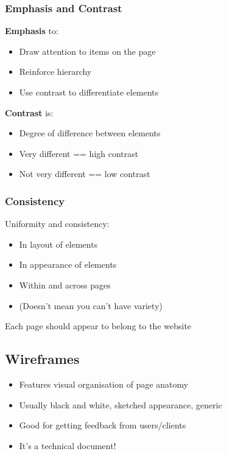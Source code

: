 \subsubsection{Emphasis and Contrast}
\textbf{Emphasis} to:
\begin{itemize}
	\item Draw attention to items on the page
	\item Reinforce hierarchy
	\item Use contrast to differentiate elements	
\end{itemize}
\textbf{Contrast} is:
\begin{itemize}
	\item Degree of difference between elements
	\item Very different == high contrast
	\item Not very different == low contrast	
\end{itemize}

\subsubsection{Consistency}
Uniformity and consistency:
\begin{itemize}
	\item In layout of elements
	\item In appearance of elements
	\item Within and across pages
	\item (Doesn't mean you can't have variety)	
\end{itemize}
Each page should appear to belong to the website

\subsection{Wireframes}
\begin{itemize}
	\item Features visual organisation of page anatomy
	\item Usually black and white, sketched appearance, generic
	\item Good for getting feedback from users/clients
	\item It's a technical document!	
\end{itemize}
